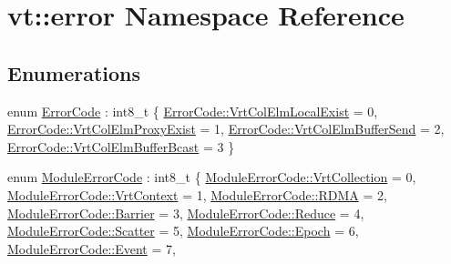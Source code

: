 \hypertarget{namespacevt_1_1error}{}\section{vt\+:\+:error Namespace Reference}
\label{namespacevt_1_1error}
\subsection*{Enumerations}
\begin{DoxyCompactItemize}
\item 
enum \hyperlink{namespacevt_1_1error_a2d36cef4c5ee65ddf503f7f4127e1829}{Error\+Code} \+: int8\+\_\+t \{ \hyperlink{namespacevt_1_1error_a2d36cef4c5ee65ddf503f7f4127e1829a1181813393d5f24c2bd6ee3d2ce27d2d}{Error\+Code\+::\+Vrt\+Col\+Elm\+Local\+Exist} = 0, 
\hyperlink{namespacevt_1_1error_a2d36cef4c5ee65ddf503f7f4127e1829a7c14bd41570a1ad6c27fb7db1917fdec}{Error\+Code\+::\+Vrt\+Col\+Elm\+Proxy\+Exist} = 1, 
\hyperlink{namespacevt_1_1error_a2d36cef4c5ee65ddf503f7f4127e1829a543e09f1c5a5278ef1975e2fab2e7769}{Error\+Code\+::\+Vrt\+Col\+Elm\+Buffer\+Send} = 2, 
\hyperlink{namespacevt_1_1error_a2d36cef4c5ee65ddf503f7f4127e1829aecb7e4027cb1633a43fee5d34d9389b9}{Error\+Code\+::\+Vrt\+Col\+Elm\+Buffer\+Bcast} = 3
 \}
\item 
enum \hyperlink{namespacevt_1_1error_a4ec28d13574cae1ad715adcf479d3f12}{Module\+Error\+Code} \+: int8\+\_\+t \{ \newline
\hyperlink{namespacevt_1_1error_a4ec28d13574cae1ad715adcf479d3f12a134728f5bfe80998733baf8fd76bf965}{Module\+Error\+Code\+::\+Vrt\+Collection} = 0, 
\hyperlink{namespacevt_1_1error_a4ec28d13574cae1ad715adcf479d3f12a269c80ce55d8f8c51a5c3e617a7d8f78}{Module\+Error\+Code\+::\+Vrt\+Context} = 1, 
\hyperlink{namespacevt_1_1error_a4ec28d13574cae1ad715adcf479d3f12aaa51e3c693c25c733a722637fca75f51}{Module\+Error\+Code\+::\+R\+D\+MA} = 2, 
\hyperlink{namespacevt_1_1error_a4ec28d13574cae1ad715adcf479d3f12a48656da7a6e48c6887d94f4c69c731b6}{Module\+Error\+Code\+::\+Barrier} = 3, 
\newline
\hyperlink{namespacevt_1_1error_a4ec28d13574cae1ad715adcf479d3f12aec4875f03ff0bb0b26cf76ac7f41e3c8}{Module\+Error\+Code\+::\+Reduce} = 4, 
\hyperlink{namespacevt_1_1error_a4ec28d13574cae1ad715adcf479d3f12a09870720ca8134284e4e305ac6ce5f19}{Module\+Error\+Code\+::\+Scatter} = 5, 
\hyperlink{namespacevt_1_1error_a4ec28d13574cae1ad715adcf479d3f12ad5d00abe34d0a2a47284b4bd534e4030}{Module\+Error\+Code\+::\+Epoch} = 6, 
\hyperlink{namespacevt_1_1error_a4ec28d13574cae1ad715adcf479d3f12aa4ecfc70574394990cf17bd83df499f7}{Module\+Error\+Code\+::\+Event} = 7, 

\end{DoxyCompactItemize}
